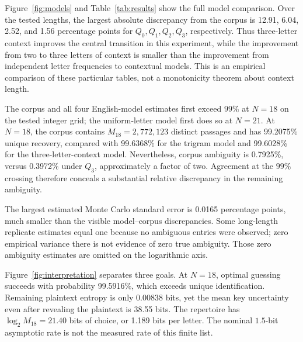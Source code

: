 Figure~\ref{fig:models} and Table~\ref{tab:results} show the full model comparison. Over the tested lengths, the largest absolute discrepancy from the corpus is 12.91, 6.04, 2.52, and 1.56 percentage points for $Q_0,Q_1,Q_2,Q_3$, respectively. Thus three-letter context improves the central transition in this experiment, while the improvement from two to three letters of context is smaller than the improvement from independent letter frequencies to contextual models. This is an empirical comparison of these particular tables, not a monotonicity theorem about context length.

The corpus and all four English-model estimates first exceed $99\%$ at $N=18$ on the tested integer grid; the uniform-letter model first does so at $N=21$. At $N=18$, the corpus contains $M_{18}=2,772,123$ distinct passages and has 99.2075\% unique recovery, compared with 99.6368\% for the trigram model and 99.6028\% for the three-letter-context model. Nevertheless, corpus ambiguity is 0.7925\%, versus 0.3972\% under $Q_3$, approximately a factor of two. Agreement at the $99\%$ crossing therefore conceals a substantial relative discrepancy in the remaining ambiguity.

The largest estimated Monte Carlo standard error is 0.0165 percentage points, much smaller than the visible model--corpus discrepancies. Some long-length replicate estimates equal one because no ambiguous entries were observed; zero empirical variance there is not evidence of zero true ambiguity. Those zero ambiguity estimates are omitted on the logarithmic axis.

Figure~\ref{fig:interpretation} separates three goals. At $N=18$, optimal guessing succeeds with probability 99.5916\%, which exceeds unique identification. Remaining plaintext entropy is only 0.00838 bits, yet the mean key uncertainty even after revealing the plaintext is 38.55 bits. The repertoire has $\log_2 M_{18}=21.40$ bits of choice, or 1.189 bits per letter. The nominal $1.5$-bit asymptotic rate is not the measured rate of this finite list.
